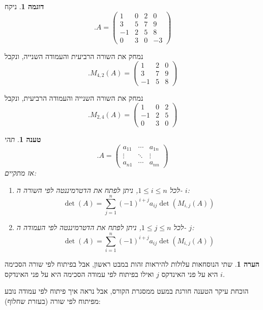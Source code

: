 \documentclass[12pt]{report}
\theoremstyle{plain}
\newtheorem{proposition}[theorem]{טענה}
\theoremstyle{definition}
\newtheorem{example}{דוגמה}[chapter]
\newtheorem{remark}{הערה}[chapter]
\newcommand{\0}{\mathbf{0}}
\begin{document}
\begin{example}
ניקח
$$
.A=\begin{pmatrix}
1 & 0 & 2 & 0 \\
3 & 5 & 7 & 9\\
-1 & 2 & 5 & 8 \\
0 & 3 & 0 & -3 
\end{pmatrix}
$$

נמחק את השורה הרביעית והעמודה השנייה, ונקבל
$$
.M_{4,2}(A)=\begin{pmatrix}
1 & 2 & 0 \\
3 & 7 & 9\\
-1 & 5 & 8
\end{pmatrix}
$$

נמחק את השורה השנייה והעמודה הרביעית, ונקבל
$$
.M_{2,4}(A)=\begin{pmatrix}
1 & 0 & 2 \\
-1 & 2 & 5 \\
0 & 3 & 0 
\end{pmatrix}
$$

\end{example}

\begin{proposition}\label{prop:laplace}
תהי
$$
.A=\begin{pmatrix}a_{11} & \cdots & a_{1n}\\
\vdots & \ddots & \vdots\\
a_{n1} & \cdots & a_{nn}
\end{pmatrix}
$$
אז מתקיים:
\begin{enumerate}[label=\alph*.]
\item
לכל
$1\leq i \leq n$, 
ניתן לפתח את הדטרמיננטה לפי השורה ה-
$i$:
$$
\det(A)=\sum_{j=1}^n (-1)^{i+j}a_{ij}\det(M_{i,j}(A))
$$


\item
לכל
$1\leq j \leq n$, 
ניתן לפתח את הדטרמיננטה לפי העמודה ה-
$j$:
$$
\det(A)=\sum_{i=1}^n (-1)^{i+j}a_{ij}\det(M_{i,j}(A))
$$


\end{enumerate}
\end{proposition}

\begin{remark}
שתי הנוסחאות עלולות להיראות זהות במבט ראשון, אבל בפיתוח לפי שורה הסכימה היא על פני האינדקס 
$j$
ואילו בפיתוח לפי עמודה הסכימה היא על פני האינדקס 
$i$.
\end{remark}

הוכחת עיקר הטענה חורגת במעט ממסגרת הקורס, אבל נראה איך פיתוח לפי עמודה נובע מפיתוח לפי שורה (בעזרת שחלוף):
\end{document}
